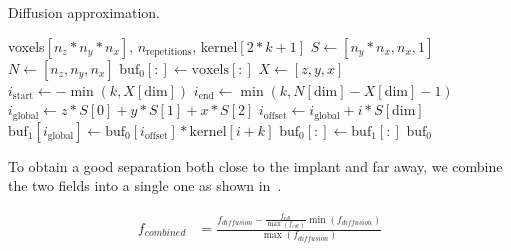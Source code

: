 \documentclass[pdflatex,sn-mathphys]{sn-jnl}%
\theoremstyle{thmstyleone}%
\theoremstyle{thmstyletwo}%
\theoremstyle{thmstylethree}%
\begin{document}
\begin{algorithm}
    \caption{Diffusion approximation.}
    \label{alg:diffusion}
    \begin{algorithmic}
         {voxels$[n_z*n_y*n_x]$, $n_\text{repetitions}$, \newline \indent \indent kernel$[2*k+1]$}
            \State $S \gets [n_y * n_x, n_x, 1]$
            \State $N \gets [n_z, n_y, n_x]$
            \State $\text{buf}_0[:] \gets \text{voxels}[:]$
                        \State $X \gets [z,y,x]$
                        \State $i_\text{start} \gets - \min (k, X[\text{dim}])$
                        \State $i_\text{end} \gets \min (k, N[\text{dim}] - X[\text{dim}] - 1)$
                        \State $i_\text{global} \gets z*S[0] + y*S[1] + x*S[2]$
                            \State $i_\text{offset} \gets i_\text{global} + i*S[\text{dim}]$
                            \State $\text{buf}_1[i_\text{global}] \gets \text{buf}_0[i_\text{offset}] * \text{kernel}[i+k]$
                        \EndFor
                    \EndFor
                    \State $\text{buf}_0[:] \gets \text{buf}_1[:]$
                \EndFor
            \EndFor
            \State \Return $\text{buf}_0$
        \EndFunction
    \end{algorithmic}
\end{algorithm}

To obtain a good separation both close to the implant and far away, we combine the two fields into a
single one as shown in~.

%

\begin{equation}
    \label{eq:field-comb}
    \begin{split}
        f_{combined} &= \frac{f_{diffusion} - \frac{f_{edt}}{\max (f_{edt})} \min (f_{diffusion})}{\max (f_{diffusion})}
    \end{split}
\end{equation}
\end{document}
